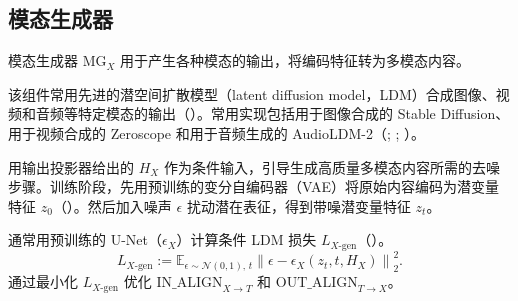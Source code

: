 \subsection{模态生成器}
\label{sec:ch09-modality-generator}
\begin{keypoint}
模态生成器 $\mathrm{MG}_X$ 用于产生各种模态的输出，将编码特征转为多模态内容。
\end{keypoint}

\begin{practicaltip}
该组件常用先进的潜空间扩散模型（latent diffusion model，LDM）合成图像、视频和音频等特定模态的输出（）。常用实现包括用于图像合成的 Stable Diffusion、用于视频合成的 Zeroscope 和用于音频生成的 AudioLDM-2（; ; ）。
\end{practicaltip}

用输出投影器给出的 $H_X$ 作为条件输入，引导生成高质量多模态内容所需的去噪步骤。训练阶段，先用预训练的变分自编码器（VAE）将原始内容编码为潜变量特征 $z_0$（）。然后加入噪声 $\epsilon$ 扰动潜在表征，得到带噪潜变量特征 $z_t$。

通常用预训练的 U-Net（$\epsilon_X$）计算条件 LDM 损失 $L_{X\text{-gen}}$（）。
\begin{equation}
L_{X\text{-gen}}:=
\mathbb{E}_{\epsilon\sim\mathcal{N}(0,1),\,t}
\left\lVert\epsilon-\epsilon_X(z_t,t,H_X)\right\rVert_2^2.
\label{eq:ch09-modality-generator-loss}
\end{equation}
通过最小化 $L_{X\text{-gen}}$ 优化 $\mathrm{IN\_ALIGN}_{X\to T}$ 和 $\mathrm{OUT\_ALIGN}_{T\to X}$。
